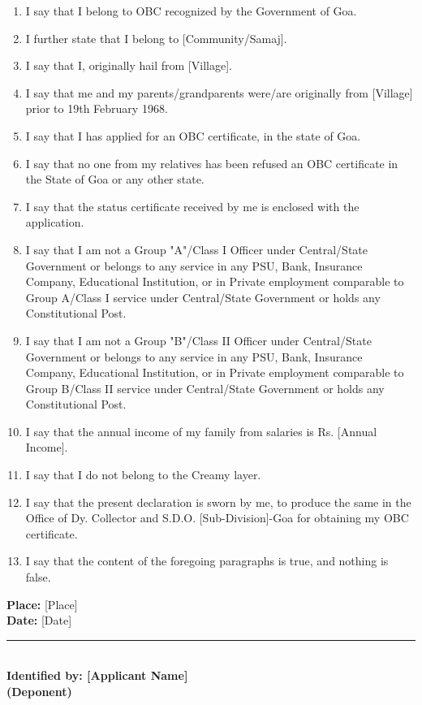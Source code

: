 \documentclass[10pt, a4paper]{article}
\begin{document}
\begin{enumerate}
    \item I say that I belong to OBC recognized by the Government of Goa.
    \item I further state that I belong to [Community/Samaj].
    \item I say that I, originally hail from [Village].
    \item I say that me and my parents/grandparents were/are originally from [Village] prior to 19th February 1968.
    \item I say that I has applied for an OBC certificate, in the state of Goa.
    \item I say that no one from my relatives has been refused an OBC certificate in the State of Goa or any other state.
    \item I say that the status certificate received by me is enclosed with the application.
    \item I say that I am not a Group "A"/Class I Officer under Central/State Government or belongs to any service in any PSU, Bank, Insurance Company, Educational Institution, or in Private employment comparable to Group A/Class I service under Central/State Government or holds any Constitutional Post.
    \item I say that I am not a Group "B"/Class II Officer under Central/State Government or belongs to any service in any PSU, Bank, Insurance Company, Educational Institution, or in Private employment comparable to Group B/Class II service under Central/State Government or holds any Constitutional Post.
    \item I say that the annual income of my family from salaries is Rs. [Annual Income].
    \item I say that I do not belong to the Creamy layer.
    \item I say that the present declaration is sworn by me, to produce the same in the Office of Dy. Collector and S.D.O. [Sub-Division]-Goa for obtaining my OBC certificate.
    \item I say that the content of the foregoing paragraphs is true, and nothing is false.
\end{enumerate}

\vspace{0.3cm}
\noindent \textbf{Place:} [Place] \\
\textbf{Date:} [Date]

\vspace{0.5cm}
\begin{flushleft}
    \vspace{0.2cm}
    \rule{6cm}{0.4pt} \\
    \textbf{Identified by: [Applicant Name]} \\
    \textbf{(Deponent)}
\end{flushleft}
\end{document}
